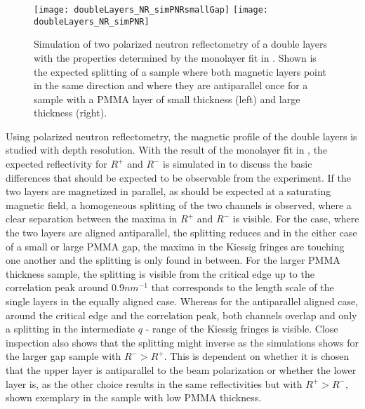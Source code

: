 \documentclass[\main/dresen_thesis.tex]{subfiles}
\begin{document}
  \label{sec:doubleLayers:pnr}
  
  \begin{figure}[tb]
    \centering
    \texttt{[image: doubleLayers\_NR\_simPNRsmallGap]}
    \texttt{[image: doubleLayers\_NR\_simPNR]}
    \caption{\label{fig:doubleLayers:pnrSimulation}Simulation of two polarized neutron reflectometry of a double layers with the properties determined by the monolayer fit in . Shown is the expected splitting of a sample where both magnetic layers point in the same direction and where they are antiparallel once for a sample with a PMMA layer of small thickness (left) and large thickness (right).}
  \end{figure}

  Using polarized neutron reflectometry, the magnetic profile of the double layers is studied with depth resolution.
  With the result of the monolayer fit in , the expected reflectivity for $R^{+}$ and $R^{-}$ is simulated in  to discuss the basic differences that should be expected to be observable from the experiment.
  If the two layers are magnetized in parallel, as should be expected at a saturating magnetic field, a homogeneous splitting of the two channels is observed, where a clear separation between the maxima in $R^{+}$ and $R^{-}$ is visible.
  For the case, where the two layers are aligned antiparallel, the splitting reduces and in the either case of a small or large PMMA gap, the maxima in the Kiessig fringes are touching one another and the splitting is only found in between.
  For the larger PMMA thickness sample, the splitting is visible from the critical edge up to the correlation peak around $0.9 \unit{nm^{-1}}$ that corresponds to the length scale of the single layers in the equally aligned case.
  Whereas for the antiparallel aligned case, around the critical edge and the correlation peak, both channels overlap and only a splitting in the intermediate $q$ - range of the Kiessig fringes is visible.
  Close inspection also shows that the splitting might inverse as the simulations shows for the larger gap sample with $R^{-} > R^{+}$.
  This is dependent on whether it is chosen that the upper layer is antiparallel to the beam polarization or whether the lower layer is, as the other choice results in the same reflectivities but with $R^{+} > R^{-}$, shown exemplary in the sample with low PMMA thickness.
  \\
\end{document}
